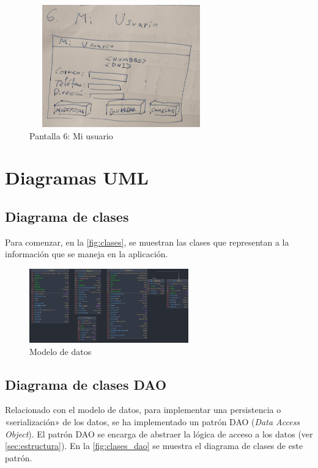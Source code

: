 \begin{figure}
    \centering
    \includegraphics[width=300px,height=200px]{recursos/prototipos/mi_usuario}
    \caption{Pantalla 6: Mi usuario}
    \label{fig:mi_usuario}
\end{figure}


\newpage


\section{Diagramas UML}\label{sec:diagrama_de_clases}

\subsection{Diagrama de clases}\label{subsec:diagrama_de_clases}

Para comenzar, en la \autoref{fig:clases}, se muestran las clases que representan a la información que se maneja en la aplicación.

\begin{figure}[h]
    \centering
    \includegraphics[width=260px]{recursos/diagramas/clases}
    \caption{Modelo de datos}
    \label{fig:clases}
\end{figure}

\subsection{Diagrama de clases DAO}\label{subsec:diagrama_de_clases_dao}

Relacionado con el modelo de datos, para implementar una persistencia o «serialización» de los datos, se ha implementado un patrón DAO (\textit{Data Access Object}).
El patrón DAO se encarga de abstraer la lógica de acceso a los datos (ver \autoref{sec:estructura}).
En la \autoref{fig:clases_dao} se muestra el diagrama de clases de este patrón.

